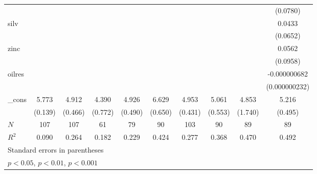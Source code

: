 {\begin{tabular}{l*{9}{c}}
            &                     &                     &                     &                     &                     &                     &                     &                     &    (0.0780)         \\
[1em]
silv        &                     &                     &                     &                     &                     &                     &                     &                     &      0.0433         \\
            &                     &                     &                     &                     &                     &                     &                     &                     &    (0.0652)         \\
[1em]
zinc        &                     &                     &                     &                     &                     &                     &                     &                     &      0.0562         \\
            &                     &                     &                     &                     &                     &                     &                     &                     &    (0.0958)         \\
[1em]
oilres      &                     &                     &                     &                     &                     &                     &                     &                     &-0.000000682\sym{**} \\
            &                     &                     &                     &                     &                     &                     &                     &                     &(0.000000232)         \\
[1em]
\_cons      &       5.773\sym{***}&       4.912\sym{***}&       4.390\sym{***}&       4.926\sym{***}&       6.629\sym{***}&       4.953\sym{***}&       5.061\sym{***}&       4.853\sym{**} &       5.216\sym{***}\\
            &     (0.139)         &     (0.466)         &     (0.772)         &     (0.490)         &     (0.650)         &     (0.431)         &     (0.553)         &     (1.740)         &     (0.495)         \\
\hline
\(N\)       &         107         &         107         &          61         &          79         &          90         &         103         &          90         &          89         &          89         \\
\(R^{2}\)   &       0.090         &       0.264         &       0.182         &       0.229         &       0.424         &       0.277         &       0.368         &       0.470         &       0.492         \\
\hline\hline
\multicolumn{10}{l}{\footnotesize Standard errors in parentheses}\\
\multicolumn{10}{l}{\footnotesize \sym{*} \(p<0.05\), \sym{**} \(p<0.01\), \sym{***} \(p<0.001\)}\\
\end{tabular}
}
